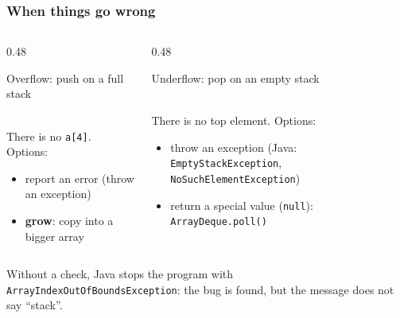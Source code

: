 \documentclass[aspectratio=169,10pt,compress]{beamer}
\begin{document}
\begin{frame}[t,fragile] \frametitle{When things go wrong}
  \begin{columns}[T]
    \begin{column}{0.48\textwidth}
      \begin{block}{Overflow: push on a full stack}
        \\[0.3em]
        \small There is no \texttt{a[4]}. Options:
        \begin{itemize}\small
          \item report an error (throw an exception)
          \item \textbf{grow}: copy into a bigger array
        \end{itemize}
      \end{block}
    \end{column}
    \begin{column}{0.48\textwidth}
      \begin{block}{Underflow: pop on an empty stack}
        \\[0.3em]
        \small There is no top element. Options:
        \begin{itemize}\small
          \item throw an exception (Java: \texttt{EmptyStackException}, \texttt{NoSuchElementException})
          \item return a special value (\texttt{null}): \texttt{ArrayDeque.poll()}
        \end{itemize}
      \end{block}
    \end{column}
  \end{columns}
  \vspace{0.3em}
  \small Without a check, Java stops the program with \texttt{ArrayIndexOutOfBoundsException}: the bug is found, but the message does not say ``stack''.
\end{frame}

\end{document}
